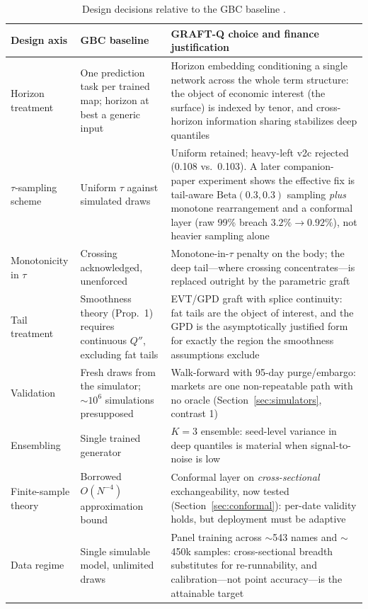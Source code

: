 \documentclass[11pt]{article}
\begin{document}
\begin{table}[t]
\centering
\begin{threeparttable}
\caption{Design decisions relative to the GBC baseline \citep{polson2023gbc, nareklishvili2025gqbp}.}
\label{tab:gbc}
\footnotesize
\begin{tabular}{p{}p{}p{}}
\toprule
Design axis & GBC baseline & GRAFT-Q choice and finance justification \\
\midrule
Horizon treatment & One prediction task per trained map; horizon at best a generic input & Horizon embedding conditioning a single network across the whole term structure: the object of economic interest (the surface) is indexed by tenor, and cross-horizon information sharing stabilizes deep quantiles \\
$\tau$-sampling scheme & Uniform $\tau$ against simulated draws & Uniform retained; heavy-left v2c rejected (0.108 vs.\ 0.103). A later companion-paper experiment shows the effective fix is tail-aware $\mathrm{Beta}(0.3,0.3)$ sampling \emph{plus} monotone rearrangement and a conformal layer (raw 99\% breach $3.2\% \to 0.92\%$), not heavier sampling alone \\
Monotonicity in $\tau$ & Crossing acknowledged, unenforced & Monotone-in-$\tau$ penalty on the body; the deep tail---where crossing concentrates---is replaced outright by the parametric graft \\
Tail treatment & Smoothness theory (Prop.~1) requires continuous $Q''$, excluding fat tails & EVT/GPD graft with splice continuity: fat tails are the object of interest, and the GPD is the asymptotically justified form for exactly the region the smoothness assumptions exclude \citep{pickands1975, balkema1974} \\
Validation & Fresh draws from the simulator; $\sim 10^6$ simulations presupposed & Walk-forward with 95-day purge/embargo: markets are one non-repeatable path with no oracle (Section~\ref{sec:simulators}, contrast 1) \\
Ensembling & Single trained generator & $K=3$ ensemble: seed-level variance in deep quantiles is material when signal-to-noise is low \\
Finite-sample theory & Borrowed $O(N^{-4})$ approximation bound & Conformal layer on \emph{cross-sectional} exchangeability, now tested (Section~\ref{sec:conformal}): per-date validity holds, but deployment must be adaptive \\
Data regime & Single simulable model, unlimited draws & Panel training across $\sim$543 names and $\sim$450k samples: cross-sectional breadth substitutes for re-runnability, and calibration---not point accuracy---is the attainable target \\
\bottomrule
\end{tabular}
\end{threeparttable}
\end{table}
\end{document}

